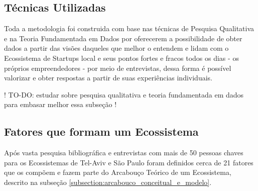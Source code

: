 \subsection{Técnicas Utilizadas}
\label{subsection:tecnicas_utilizadas}

Toda a metodologia foi construida com base nas técnicas de Pesquisa Qualitativa e na Teoria Fundamentada em Dados por oferecerem a possibilidade de obter dados a partir das visões daqueles que melhor o entendem e lidam com o Ecossistema de Startups local e seus pontos fortes e fracos todos os dias - os próprios empreendedores - por meio de entrevistas, dessa forma é possível valorizar e obter respostas a partir de suas experiências individuais.

! TO-DO: estudar sobre pesquisa qualitativa e teoria fundamentada em dados para embasar melhor essa subseção !

\subsection{Fatores que formam um Ecossistema}
\label{subsection:fatores_que_formam_um_ecossistema}

Após vasta pesquisa bibliográfica e entrevistas com mais de 50 pessoas chaves para os Ecossistemas de Tel-Aviv e São Paulo foram definidos cerca de 21 fatores que os compõem e fazem parte do Arcabouço Teórico de um Ecossistema, descrito na subseção \ref{subsection:arcabouco_conceitual_e_modelo}. 

